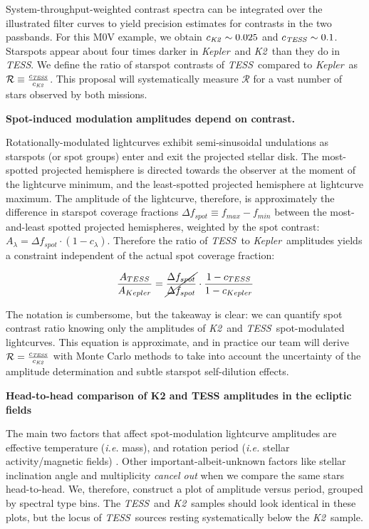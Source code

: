 \documentclass[modern]{aastex631}
\newcommand{\tess}{{\it TESS}}
\newcommand{\kepler}{{\it Kepler}}
\newcommand{\ktwo}{{\it K2}}
\begin{document}
System-throughput-weighted contrast spectra can be integrated over the illustrated filter curves to yield precision estimates for contrasts in the two passbands. For this M0V example, we obtain $c_{\ktwo}\sim0.025$ and $c_{\tess}\sim0.1$. Starspots appear about four times darker in \kepler\ and \ktwo\ than they do in \tess. We define the ratio of starspot contrasts of \tess\ compared to \kepler\ as $\mathcal{R}\equiv \frac{c_{\tess}}{c_{\ktwo}}$. This proposal will systematically measure $\mathcal{R}$ for a vast number of stars observed by both missions.

\noindent \textbf{Spot-induced modulation amplitudes depend on contrast.}

Rotationally-modulated lightcurves exhibit semi-sinusoidal undulations as starspots (or spot groups) enter and exit the projected stellar disk. The most-spotted projected hemisphere is directed towards the observer at the moment of the lightcurve minimum, and the least-spotted projected hemisphere at lightcurve maximum. The amplitude of the lightcurve, therefore, is approximately the difference in starspot coverage fractions $\Delta f_{spot} \equiv f_{max}-f_{min}$ between the most-and-least spotted projected hemispheres, weighted by the spot contrast: $ A_\lambda = \Delta f_{spot} \cdot (1-c_\lambda)$. Therefore the ratio of \tess\ to \kepler\ amplitudes yields a constraint independent of the actual spot coverage fraction:

$$ \frac{A_{TESS}}{A_{Kepler}} = \cancel{\frac{\Delta f_{spot}}{\Delta f_{spot}}} \cdot \frac{1-c_{TESS}}{1-c_{Kepler}} $$

The notation is cumbersome, but the takeaway is clear: we can quantify spot contrast ratio knowing only the amplitudes of \ktwo\ and \tess\ spot-modulated lightcurves. This equation is approximate, and in practice our team will derive $\mathcal{R}= \frac{c_{\tess}}{c_{\ktwo}}$ with Monte Carlo methods to take into account the uncertainty of the amplitude determination and subtle starspot self-dilution effects.
\newline

\noindent \textbf{Head-to-head comparison of K2 and TESS amplitudes in the ecliptic fields}


The main two factors that affect spot-modulation lightcurve amplitudes are effective temperature (\emph{i.e.} mass), and rotation period (\emph{i.e.} stellar activity/magnetic fields) \cite{2014ApJS..211...24M}. Other important-albeit-unknown factors like stellar inclination angle and multiplicity \emph{cancel out} when we compare the same stars head-to-head. We, therefore, construct a plot of amplitude versus period, grouped by spectral type bins. The \tess\ and \ktwo\ samples should look identical in these plots, but the locus of \tess\ sources resting systematically below the \ktwo\ sample.
\end{document}
